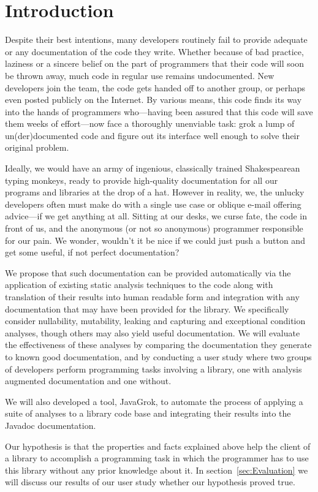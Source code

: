 \section{Introduction}

Despite their best intentions, many developers routinely fail to provide
adequate or any documentation of the code they write.  Whether because of bad
practice, laziness or a sincere belief on the part of programmers that their
code will soon be thrown away, much code in regular use remains undocumented.
New developers join the team, the code gets handed off to another group, or
perhaps even posted publicly on the Internet.  By various means, this code
finds its way into the hands of programmers who---having been assured that this
code will save them weeks of effort---now face a thoroughly unenviable task:
grok a lump of un(der)documented code and figure out its interface well enough
to solve their original problem.

Ideally, we would have an army of ingenious, classically trained Shakespearean
typing monkeys, ready to provide high-quality documentation for all our
programs and libraries at the drop of a hat.  However in reality, we, the
unlucky developers often must make do with a single use case or oblique e-mail
offering advice---if we get anything at all.  Sitting at our desks, we curse
fate, the code in front of us, and the anonymous (or not so anonymous)
programmer responsible for our pain.  We wonder, wouldn't it be nice if we
could just push a button and get some useful, if not perfect documentation?

We propose that such documentation can be provided automatically via the
application of existing static analysis techniques to the code along with
translation of their results into human readable form and integration with any
documentation that may have been provided for the library. We specifically
consider nullability, mutability, leaking and capturing and exceptional
condition analyses, though others may also yield useful documentation. We will
evaluate the effectiveness of these analyses by comparing the documentation
they generate to known good documentation, and by conducting a user study where
two groups of developers perform programming tasks involving a library, one
with analysis augmented documentation and one without.

We will also developed a tool, JavaGrok, to automate the process of applying a
suite of analyses to a library code base and integrating their results into the
Javadoc documentation.

Our hypothesis is that the properties and facts explained above help the 
client of a library to accomplish a programming task in which the programmer
has to use this library without any prior knowledge about it.
In section~\ref{sec:Evaluation} we will discuss our results of our user study
whether our hypothesis proved true.